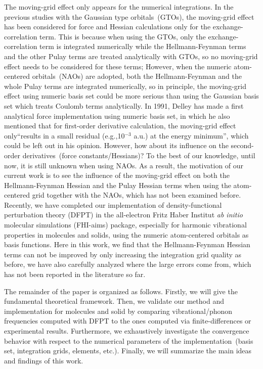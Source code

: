 \documentclass[journal=jpca,manuscript=article]{achemso}
\begin{document}
   
The moving-grid effect only appears for the numerical integrations. In the previous studies\cite{Johnson1993,Baker1994,Malagoli2003} with the Gaussian type orbitals~(GTOs), the moving-grid effect has been considered for force and Hessian calculations only for the exchange-correlation term. This is because when using the GTOs, only the exchange-correlation term is integrated numerically while the Hellmann-Feynman terms and the other Pulay terms are treated analytically with GTOs, so no moving-grid effect needs to be considered for these terms; However, when the numeric atom-centered orbitals~(NAOs) are adopted, both the Hellmann-Feynman and the whole Pulay terms are integrated numerically\cite{Delley1991}, so in principle,
the moving-grid effect using numeric basis set could be more serious than using the Gaussian basis set which treats Coulomb terms analytically. 
In 1991, Delley\cite{Delley1991} has made a first analytical force implementation using numeric basis set, in which he also mentioned that for first-order derivative calculation, the moving-grid effect only``results in a small residual  (e.g.,10$^{-3}$ a.u.) at the energy minimum'', which could be left out
in his opinion. However, how about its influence on the second-order derivatives~(force constants/Hessians)? To the best of our knowledge, until now, it is still unknown when using NAOs. As a result, the motivation of our current work is to see the influence of the moving-grid effect on both the Hellmann-Feynman Hessian and the Pulay Hessian terms when using the atom-centered grid together with the NAOs, which has not been examined before. 
Recently, we have completed our implementation\cite{Shang2017,Shang2018} of density-functional perturbation theory (DFPT) in the all-electron Fritz Haber Institut \textit{ab initio} molecular simulations (FHI-aims) package\citep{Blum2009}, especially for harmonic vibrational properties\cite{Shang2017} in molecules and solids, 
using the numeric atom-centered orbitals as basis functions. Here in this work, we find that the Hellmann-Feynman Hessian terms can not be improved by only increasing the integration grid quality as before, we have also carefully analyzed where the large errors come from, which has not been reported in the literature so far.
  
   



The remainder of the paper is organized as follows. Firstly, we will give the fundamental theoretical framework. Then, we validate our method and implementation for molecules and solid by comparing vibrational/phonon frequencies computed with DFPT to the ones computed via finite-differences or experimental results. Furthermore, we exhaustively investigate the convergence behavior with respect to the numerical parameters of the implementation~(basis set, integration grids, elements, etc.). Finally, we will summarize the main ideas and findings of this work.
\end{document}
